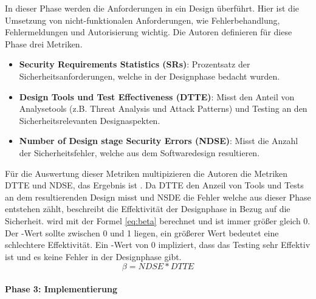 \documentclass[12pt, a4paper, ngerman]{article}
\begin{document}
In dieser Phase werden die Anforderungen in ein Design überführt. 
Hier ist die Umsetzung von nicht-funktionalen Anforderungen, wie Fehlerbehandlung, Fehlermeldungen und Autorisierung wichtig.
Die Autoren definieren für diese Phase drei Metriken.
\begin{itemize}
  \item \textbf{Security Requirements Statistics (SRs)}: Prozentsatz der Sicherheitsanforderungen, welche in der Designphase bedacht wurden.
  \item \textbf{Design Tools und Test Effectiveness (DTTE)}: Misst den Anteil von Analysetools (z.B. Threat Analysis und Attack Patterns) und Testing an den Sicherheitsrelevanten Designaspekten. 
  \item \textbf{Number of Design stage Security Errors (NDSE)}: Misst die Anzahl der Sicherheitsfehler, welche aus dem Softwaredesign resultieren. 
\end{itemize}
Für die Auswertung dieser Metriken multipizieren die Autoren die Metriken DTTE und NDSE, das Ergebnis ist \beta. 
Da DTTE den Anzeil von Tools und Tests an dem resultierenden Design misst und NSDE die Fehler welche aus dieser Phase entstehen zählt, 
beschreibt \beta die Effektivität der Designphase in Bezug auf die Sicherheit.
\beta wird mit der Formel \ref{eq:beta} berechnet und ist immer größer gleich 0. 
Der \beta-Wert sollte zwischen 0 und 1 liegen, ein größerer Wert bedeutet eine schlechtere Effektivität.
Ein \beta-Wert von 0 impliziert, dass das Testing sehr Effektiv ist und es keine Fehler in der Designphase gibt.
\begin{equation} \label{eq:beta}
  \beta = NDSE * DTTE
\end{equation}

\paragraph{Phase 3: Implementierung}
\end{document}
